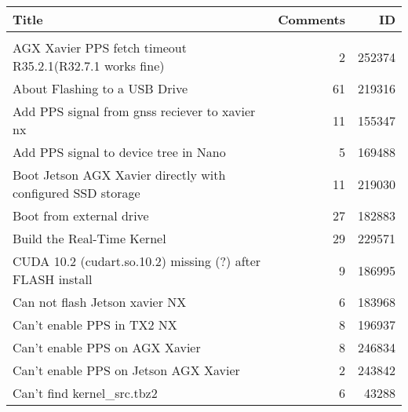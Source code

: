 \small
\begin{longtable}{p{}rr}
    Title                                                                                               & Comments & ID     \\
    \hline                                                                                                                  \\

    AGX Xavier PPS fetch timeout R35.2.1(R32.7.1 works fine)                                            & 2        & 252374 \\
    About Flashing to a USB Drive                                                                       & 61       & 219316 \\
    Add PPS signal from gnss reciever to xavier nx                                                      & 11       & 155347 \\
    Add PPS signal to device tree in Nano                                                               & 5        & 169488 \\
    Boot Jetson AGX Xavier directly with configured SSD storage                                         & 11       & 219030 \\
    Boot from external drive                                                                            & 27       & 182883 \\
    Build the Real-Time Kernel                                                                          & 29       & 229571 \\
    CUDA 10.2 (cudart.so.10.2) missing (?) after FLASH install                                          & 9        & 186995 \\
    Can not flash Jetson xavier NX                                                                      & 6        & 183968 \\
    Can’t enable PPS in TX2 NX                                                                          & 8        & 196937 \\
    Can’t enable PPS on AGX Xavier                                                                      & 8        & 246834 \\
    Can’t enable PPS on Jetson AGX Xavier                                                               & 2        & 243842 \\
    Can’t find kernel\_src.tbz2                                                                         & 6        & 43288  \\

\end{longtable}
